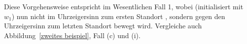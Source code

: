 \documentclass[ngerman]{seminarbeitrag}
\begin{document}
Diese Vorgehensweise entspricht im Wesentlichen Fall 1, wobei \ls (initialisiert mit $w_{1}$) nun nicht im Uhrzeigersinn zum ersten Standort , sondern gegen den Uhrzeigersinn zum letzten Standort  bewegt wird. Vergleiche auch Abbildung~\ref{zweites beispiel}, Fall (c) und (i).
\begin{figure}[h]
    \qquad

\end{figure}
\end{document}
